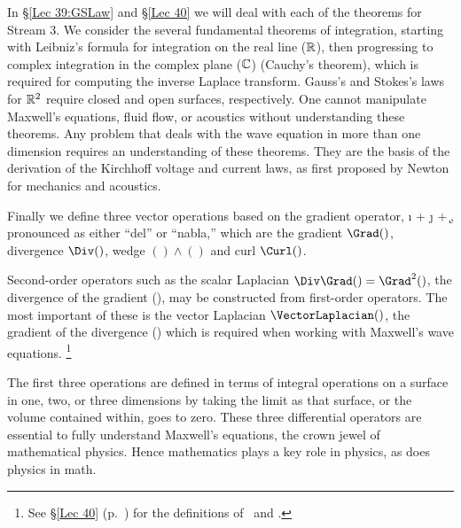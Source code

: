 \documentclass{ximera}
\begin{document}
In \S \ref{Lec 39:GSLaw} and \S\ref{Lec 40} we will deal with each of the theorems for Stream 3. We consider the several fundamental theorems of integration, starting with Leibniz's
formula for integration on the real line ($\mathbb{R}$), then progressing to complex integration in the
complex plane ($\mathbb{C}$) (Cauchy's theorem), which is required for computing the inverse Laplace
transform. Gauss's and Stokes's laws for $\mathbb{R}^2$ require closed and open surfaces, respectively.
One cannot manipulate Maxwell's equations, fluid flow, or acoustics without understanding these theorems.
Any problem that deals with the wave equation in more than one dimension requires an understanding of
these theorems. They are the basis of the derivation of the Kirchhoff voltage and current laws, as first proposed by Newton for mechanics
and acoustics.

Finally we define three vector operations based on the gradient operator,
\be
\Grad \equiv
 \i {} + \j {} + \k {},
\label{eq:Grad1}
\ee
 pronounced as either ``del'' or ``nabla,'' which are the
  gradient $\Grad()$,
  divergence $\Div()$,
  wedge $()\!\wedge\!()$
  and
  curl $\Curl()$.

Second-order operators such as the 
 scalar Laplacian $\Div\Grad() = \Grad^2()$, the divergence of the gradient (\DoG), may be constructed
 from first-order operators. The most important of these is the vector Laplacian $\VectorLaplacian()$,
the gradient of the divergence (\gOd) which is required when working with Maxwell's
wave equations.%
 \footnote{See \S \ref{Lec 40} (p.~\pageref{Lec 40}) for the definitions of \DoG\ and \gOd.}

The first three operations are defined in terms of integral operations on a surface in one, two, or three dimensions
by taking the limit as that surface, or the volume contained within, goes to zero.  These three differential operators are essential to fully understand Maxwell's equations, the crown jewel
of mathematical physics.  Hence mathematics plays a key role in physics, as does physics in math.
   
  
\end{document}

